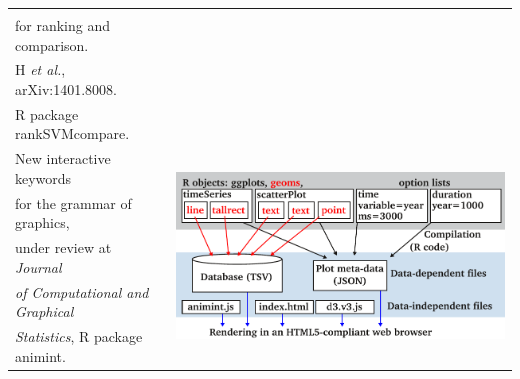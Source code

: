 \documentclass{beamer}
\begin{document}
\begin{frame}
\begin{tabular}{ll}
{}\\
for ranking and comparison.\\
H {\it et al.}, arXiv:1401.8008. \\
R package rankSVMcompare.\\
\hline
New interactive keywords& \multirow{5}{*}{
\includegraphics[height=0.2\textheight]{figure-design}
}\\
for the grammar of graphics,\\
under review at \emph{Journal}\\
\emph{ of Computational and Graphical}\\
\emph{Statistics}, R package animint.
  \end{tabular}

\end{frame}
\end{document}
